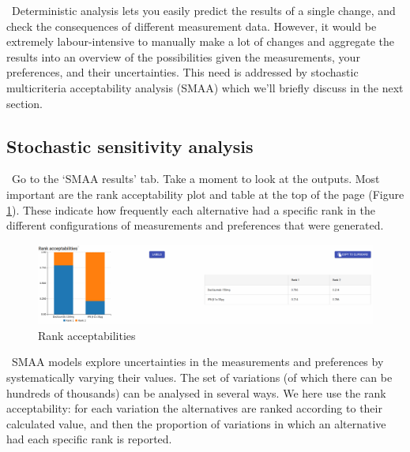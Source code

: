 \documentclass[00_mcda_tutorial.tex]{subfiles}
\begin{document}
\noindent \faGraduationCap \, Deterministic analysis lets you easily predict the results of a single change, and check the consequences of different measurement data. However, it would be extremely labour-intensive to manually make a lot of changes and aggregate the results into an overview of the possibilities given the measurements, your preferences, and their uncertainties. This need is addressed by stochastic multicriteria acceptability analysis (SMAA) which we’ll briefly discuss in the next section.

\subsection*{Stochastic sensitivity analysis}
\noindent \leftpointright \, Go to the ‘SMAA results’ tab. Take a moment to look at the outputs. Most important are the rank acceptability plot and table at the top of the page (Figure \ref{fig:rankAcceptabilities}). These indicate how frequently each alternative had a specific rank in the different configurations of measurements and preferences that were generated.
\newline

\begin{figure}[!h]
    \centering
    \includegraphics[width=\textwidth]{fig/rankAcceptabilities.png}
    \caption{Rank acceptabilities}
    \label{fig:rankAcceptabilities}
\end{figure}

\noindent \faGraduationCap \, SMAA models explore uncertainties in the measurements and preferences by systematically varying their values\footnotemark. The set of variations (of which there can be hundreds of thousands) can be analysed in several ways. We here use the rank acceptability: for each variation the alternatives are ranked according to their calculated value, and then the proportion of variations in which an alternative had each specific rank is reported.
\newline
\end{document}
